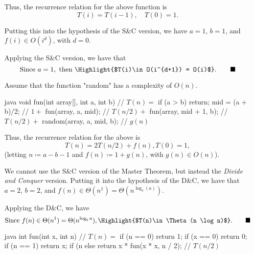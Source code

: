 \documentclass[12pt, a4paper]{article}
\newcommand{\QED}{\tag*{$\blacksquare$}}
\begin{document}
Thus, the recurrence relation for the above function is
\begin{equation*}
  T(i) = T(i-1), \quad T(0) = 1.
\end{equation*}

Putting this into the hypothesis of the S\&C version,
we have $a=1$, $b=1$, and $f(i)\in O(i^d)$, with $d=0$.

Applying the S\&C version, we have that
\begin{equation*}
  \textrm{Since } a = 1, \textrm{ then } \Highlight{$T(i)\in O(i^{d+1}) = O(i)$}. \QED
\end{equation*}



\newpage



Assume that the function "random" has a complexity of $O(n)$.
\begin{MintedUnbreakableCodeBlock}{java}
      void fun(int array[], int a, int b) { // $T(n)=$
        if (a > b) return;
        mid = (a + b)/2;                    // $1+$
        fun(array, a, mid);                 // $T(n/2)+$
        fun(array, mid + 1, b);             // $T(n/2)+$
        random(array, a, mid, b);           // $g(n)$
      }
\end{MintedUnbreakableCodeBlock}

Thus, the recurrence relation for the above is
\begin{equation*}
  T(n) = 2T(n/2) + f(n), T(0) = 1,
\end{equation*}
(letting $n \coloneqq a-b-1$ and $f(n) \coloneqq 1+g(n)$, with $g(n)\in O(n)$).

We cannot use the S\&C version of the Master Theorem,
but instead the \textit{Divide and Conquer} version.
Putting it into the hypothesis of the D\&C,
we have that $a=2$, $b=2$, and $f(n)\in\Theta(n^1) = \Theta(n^{\log_b(a)})$.

Applying the D\&C, we have
\begin{equation*}
  \textrm{Since } f(n)\in\Theta(n^1) = \Theta(n^{\log_ba}), \Highlight{$T(n)\in\Theta(n \log n)$}. \QED
\end{equation*}



\newpage



\begin{MintedUnbreakableCodeBlock}{java}
      int fun(int x, int n) {                     // $T(n)=$
        if (n == 0) return 1;
        if (x == 0) return 0;
        if (n == 1) return x;
        if (n %
        else return x * fun(x * x, n / 2);        // $T(n/2)$
      }
\end{MintedUnbreakableCodeBlock}
\end{document}
